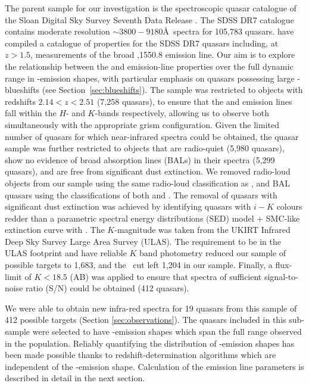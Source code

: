 The parent sample for our investigation is the spectroscopic quasar catalogue of the Sloan Digital Sky Survey \citep[SDSS;][]{york00} Seventh Data Release \citep[DR7;][]{schneider10}. 
The SDSS DR7 catalogue contains moderate resolution $\sim3800-9180$\AA\, spectra for 105,783 quasars. 
\citet{shen11} have compiled a catalogue of properties for the SDSS DR7 quasars including, at $z > 1.5$, measurements of the broad ,1550.8 emission line.
Our aim is to explore the relationship between the \ha and  emission-line properties over the full dynamic range in -emission shapes, with particular emphasis on quasars possessing large -blueshifts (see Section~\ref{sec:blueshifts}). 
The sample was restricted to objects with redshifts $2.14 < z <2.51$ (7,258 quasars), to ensure that the \hb and \ha emission lines fall within the $H$- and $K$-bands respectively, allowing us to observe both simultaneously with the appropriate grism configuration.
Given the limited number of quasars for which near-infrared spectra could be obtained, the quasar sample was further restricted to objects that are radio-quiet (5,980 quasars), show no evidence of broad absorption lines (BALs) in their spectra (5,299 quasars), and are free from significant dust extinction. 
We removed radio-loud objects from our sample using the same radio-loud classification as \citet{shen11}, and BAL quasars using the classifications of both \citet{shen11} and \citet{allen11}. 
The removal of quasars with significant dust extinction was achieved by identifying quasars with $i-K$ colours redder than a parametric spectral energy distributions (SED) model + SMC-like extinction curve with  \citep[see][]{maddox12}. 
The $K$-magnitude was taken from the UKIRT Infrared Deep Sky Survey \citep[UKIDSS;][]{lawrence07} Large Area Survey (ULAS). 
The requirement to be in the ULAS footprint and have reliable $K$ band photometry reduced our sample of possible targets to 1,683, and the \ebv\, cut left 1,204 in our sample. 
Finally, a flux-limit of $K<18.5$ (AB) was applied to ensure that spectra of sufficient signal-to-noise ratio (S/N) could be obtained (412 quasars). 
 
We were able to obtain new infra-red spectra for 19 quasars from this sample of 412 possible targets (Section \ref{sec:observations}). 
The quasars included in this sub-sample were selected to have -emission shapes which span the full range observed in the population.
Reliably quantifying the distribution of -emission shapes has been made possible thanks to redshift-determination algorithms \citep[][Allen \& Hewett 2016, in preparation]{hewett10} which are independent of the -emission shape. 
Calculation of the  emission line parameters is described in detail in the next section. 

